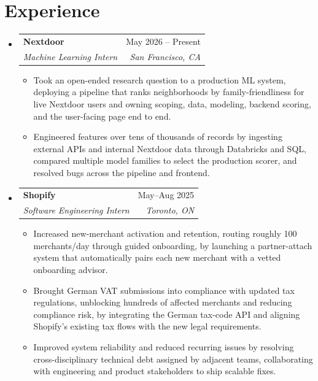 \documentclass[letterpaper,11pt]{article}
\makeatletter
\newcommand{\resumeItem}[1]{
  \item\small{
    {#1 \vspace{-3pt}}
  }
}
\newcommand{\resumeSubheading}[4]{
  \vspace{-2pt}\item
    \begin{tabular*}{0.97\textwidth}[t]{l@{\extracolsep{\fill}}r}
      \textbf{#1} & #2 \\
      \textit{\small#3} & \textit{\small #4} \\
    \end{tabular*}\vspace{-5pt}
}
\newcommand{\resumeSubHeadingListStart}{\begin{itemize}[leftmargin=0.15in, label={}]}
\newcommand{\resumeSubHeadingListEnd}{\end{itemize}}
\newcommand{\resumeItemListStart}{\begin{itemize}}
\newcommand{\resumeItemListEnd}{\end{itemize}\vspace{-7pt}}
\makeatother
\begin{document}
\section{Experience}
  \resumeSubHeadingListStart
    \resumeSubheading
      {Nextdoor}{May 2026 -- Present}
      {Machine Learning Intern}{San Francisco, CA}
      \resumeItemListStart
        \resumeItem{Took an open-ended research question to a production ML system, deploying a pipeline that ranks neighborhoods by family-friendliness for live Nextdoor users and owning scoping, data, modeling, backend scoring, and the user-facing page end to end.}
        \resumeItem{Engineered features over tens of thousands of records by ingesting external APIs and internal Nextdoor data through Databricks and SQL, compared multiple model families to select the production scorer, and resolved bugs across the pipeline and frontend.}
      \resumeItemListEnd
    \resumeSubheading
      {Shopify}{May--Aug 2025}
      {Software Engineering Intern}{Toronto, ON}
      \resumeItemListStart
        \resumeItem{Increased new-merchant activation and retention, routing roughly 100 merchants/day through guided onboarding, by launching a partner-attach system that automatically pairs each new merchant with a vetted onboarding advisor.}
        \resumeItem{Brought German VAT submissions into compliance with updated tax regulations, unblocking hundreds of affected merchants and reducing compliance risk, by integrating the German tax-code API and aligning Shopify's existing tax flows with the new legal requirements.}
        \resumeItem{Improved system reliability and reduced recurring issues by resolving cross-disciplinary technical debt assigned by adjacent teams, collaborating with engineering and product stakeholders to ship scalable fixes.}
      \resumeItemListEnd
  \resumeSubHeadingListEnd
\end{document}
